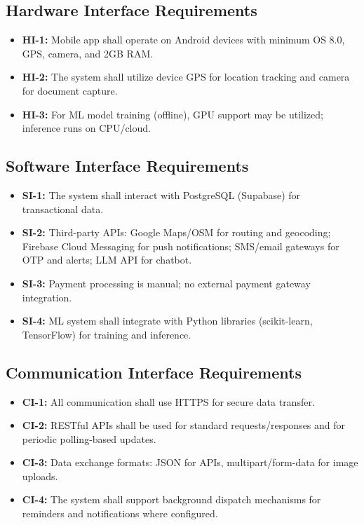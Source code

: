 \subsection{Hardware Interface Requirements}
\begin{itemize}
\item \textbf{HI-1:} Mobile app shall operate on Android devices with minimum OS 8.0, GPS, camera, and 2GB RAM.
\item \textbf{HI-2:} The system shall utilize device GPS for location tracking and camera for document capture.
\item \textbf{HI-3:} For ML model training (offline), GPU support may be utilized; inference runs on CPU/cloud.
\end{itemize}

\subsection{Software Interface Requirements}
\begin{itemize}
\item \textbf{SI-1:} The system shall interact with PostgreSQL (Supabase) for transactional data.
\item \textbf{SI-2:} Third-party APIs: Google Maps/OSM for routing and geocoding; Firebase Cloud Messaging for push notifications; SMS/email gateways for OTP and alerts; LLM API for chatbot.
\item \textbf{SI-3:} Payment processing is manual; no external payment gateway integration.
\item \textbf{SI-4:} ML system shall integrate with Python libraries (scikit-learn, TensorFlow) for training and inference.
\end{itemize}

\subsection{Communication Interface Requirements}
\begin{itemize}
\item \textbf{CI-1:} All communication shall use HTTPS for secure data transfer.
\item \textbf{CI-2:} RESTful APIs shall be used for standard requests/responses and for periodic polling-based updates.
\item \textbf{CI-3:} Data exchange formats: JSON for APIs, multipart/form-data for image uploads.
\item \textbf{CI-4:} The system shall support background dispatch mechanisms for reminders and notifications where configured.
\end{itemize}

